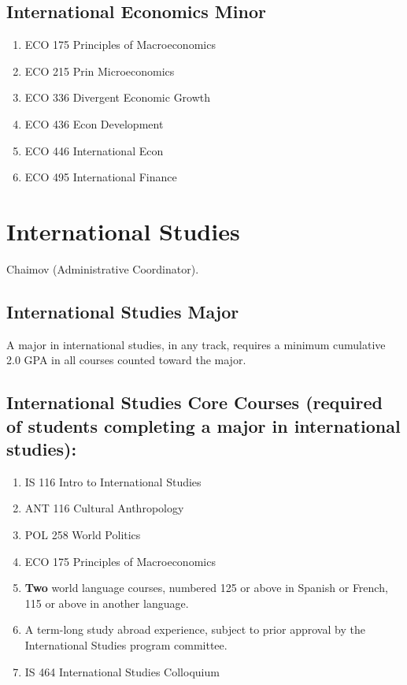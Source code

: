 \documentclass[
  letterpaper,
]{scrbook}
\providecommand{\tightlist}{%
  \setlength{\itemsep}{0pt}\setlength{\parskip}{0pt}}
\begin{document}
\subsection{International Economics
Minor}\label{international-economics-minor}

\begin{enumerate}
\def\labelenumi{\arabic{enumi}.}
\tightlist
\item
  ECO 175 Principles of Macroeconomics
\item
  ECO 215 Prin Microeconomics
\item
  ECO 336 Divergent Economic Growth
\item
  ECO 436 Econ Development
\item
  ECO 446 International Econ
\item
  ECO 495 International Finance
\end{enumerate}

\section{International Studies}\label{sec-international-studies}

Chaimov (Administrative Coordinator).

\subsection{International Studies
Major}\label{international-studies-major}

A major in international studies, in any track, requires a minimum
cumulative 2.0 GPA in all courses counted toward the major.

\subsection{International Studies Core Courses (required of students
completing a major in international
studies):}\label{international-studies-core-courses-required-of-students-completing-a-major-in-international-studies}

\begin{enumerate}
\def\labelenumi{\arabic{enumi}.}
\tightlist
\item
  IS 116 Intro to International Studies
\item
  ANT 116 Cultural Anthropology
\item
  POL 258 World Politics
\item
  ECO 175 Principles of Macroeconomics
\item
  \textbf{Two} world language courses, numbered 125 or above in Spanish
  or French, 115 or above in another language.
\item
  A term-long study abroad experience, subject to prior approval by the
  International Studies program committee.
\item
  IS 464 International Studies Colloquium
\end{enumerate}
\end{document}
